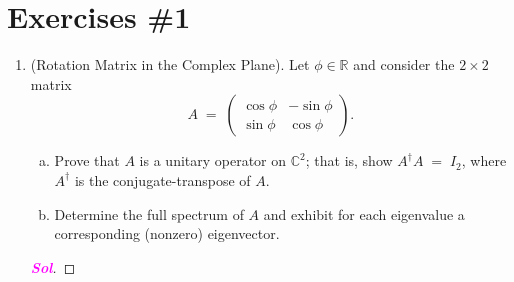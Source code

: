 \section*{Exercises \#1}
\begin{enumerate}[\bfseries 1.]
	\item (Rotation Matrix in the Complex Plane). 
	Let \(\phi\in\mathbb{R}\) and consider the \(2\times2\) matrix  
	\[
	A \;=\;
	\begin{pmatrix}
		\cos\phi & -\sin\phi\\[6pt]
		\sin\phi & \cos\phi
	\end{pmatrix}\!\!.
	\]  
	\begin{enumerate}[(a)]
		\item Prove that \(A\) is a unitary operator on \(\mathbb{C}^2\); that is, show $
		A^\dagger A \;=\; I_2$, where \(A^\dagger\) is the conjugate-transpose of \(A\).
		\item Determine the full spectrum of \(A\) and exhibit for each eigenvalue a corresponding (nonzero) eigenvector.
	\end{enumerate}
\begin{proof}[\normalfont\bfseries\textcolor{magenta}{Sol}] 
\end{proof}
\end{enumerate}
